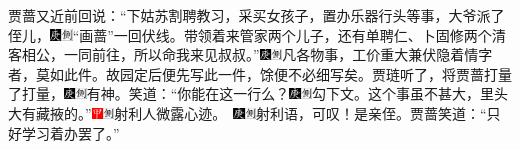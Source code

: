 贾蔷又近前回说：``下姑苏割聘教习，采买女孩子，置办乐器行头等事，大爷派了侄儿，{\includegraphics[width=3mm]{../Images/00004}\includegraphics[width=3mm]{../Images/00011}\footnotesize \kaishu ``画蔷''一回伏线。}带领着来管家两个儿子，还有单聘仁、卜固修两个清客相公，一同前往，所以命我来见叔叔。''{\includegraphics[width=3mm]{../Images/00004}\includegraphics[width=3mm]{../Images/00011}\footnotesize \kaishu 凡各物事，工价重大兼伏隐着情字者，莫如此件。故园定后便先写此一件，馀便不必细写矣。}贾琏听了，将贾蔷打量了打量，{\includegraphics[width=3mm]{../Images/00004}\includegraphics[width=3mm]{../Images/00011}\footnotesize \kaishu 有神。}笑道：``你能在这一行么？{\includegraphics[width=3mm]{../Images/00004}\includegraphics[width=3mm]{../Images/00011}\footnotesize \kaishu 勾下文。}这个事虽不甚大，里头大有藏掖的。''{\includegraphics[width=3mm]{../Images/00002}\includegraphics[width=3mm]{../Images/00011}\footnotesize \kaishu 射利人微露心迹。　\includegraphics[width=3mm]{../Images/00004}\includegraphics[width=3mm]{../Images/00011}\footnotesize \kaishu 射利语，可叹！是亲侄。}贾蔷笑道：``只好学习着办罢了。''

